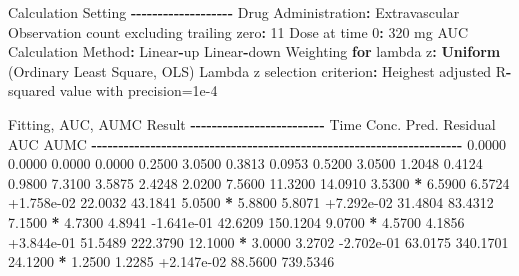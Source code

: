 \documentclass[
  10pt,
]{krantz}
\makeatletter
\newenvironment{Shaded}{\begin{snugshade}}{\end{snugshade}}
\newcommand{\ControlFlowTok}[1]{\textcolor[rgb]{0.13,0.29,0.53}{\textbf{#1}}}
\newcommand{\DecValTok}[1]{\textcolor[rgb]{0.00,0.00,0.81}{#1}}
\newcommand{\FloatTok}[1]{\textcolor[rgb]{0.00,0.00,0.81}{#1}}
\newcommand{\KeywordTok}[1]{\textcolor[rgb]{0.13,0.29,0.53}{\textbf{#1}}}
\newcommand{\NormalTok}[1]{#1}
\newcommand{\OperatorTok}[1]{\textcolor[rgb]{0.81,0.36,0.00}{\textbf{#1}}}
\newcommand{\StringTok}[1]{\textcolor[rgb]{0.31,0.60,0.02}{#1}}
\newenvironment{kframe}{%
\medskip{}
\setlength{\fboxsep}{.8em}
 \def\at@end@of@kframe{}%
 \ifinner\ifhmode%
  \def\at@end@of@kframe{\end{minipage}}%
  \begin{minipage}{\columnwidth}%
 \fi\fi%
 \def\FrameCommand##1{\hskip\@totalleftmargin \hskip-\fboxsep
 \colorbox{shadecolor}{##1}\hskip-\fboxsep
     \hskip-\linewidth \hskip-\@totalleftmargin \hskip\columnwidth}%
 \MakeFramed {\advance\hsize-\width
   \@totalleftmargin\z@ \linewidth\hsize
   \@setminipage}}%
 {\par\unskip\endMakeFramed%
 \at@end@of@kframe}
\renewenvironment{Shaded}{\begin{kframe}}{\end{kframe}}
\makeatother
\begin{document}
\begin{Shaded}
\begin{Highlighting}[]
\NormalTok{Calculation Setting}
\OperatorTok{{-}{-}{-}{-}{-}{-}{-}{-}{-}{-}{-}{-}{-}{-}{-}{-}{-}{-}{-}}
\NormalTok{Drug Administration}\OperatorTok{:}\StringTok{ }\NormalTok{Extravascular}
\NormalTok{Observation count excluding trailing zero}\OperatorTok{:}\StringTok{ }\DecValTok{11}
\NormalTok{Dose at time }\DecValTok{0}\OperatorTok{:}\StringTok{ }\DecValTok{320}\NormalTok{ mg}
\NormalTok{AUC Calculation Method}\OperatorTok{:}\StringTok{ }\NormalTok{Linear}\OperatorTok{{-}}\NormalTok{up Linear}\OperatorTok{{-}}\NormalTok{down}
\NormalTok{Weighting }\ControlFlowTok{for}\NormalTok{ lambda z}\OperatorTok{:}\StringTok{ }\KeywordTok{Uniform}\NormalTok{ (Ordinary Least Square, OLS)}
\NormalTok{Lambda z selection criterion}\OperatorTok{:}\StringTok{ }\NormalTok{Heighest adjusted R}\OperatorTok{{-}}\NormalTok{squared value with precision=}\FloatTok{1e{-}4}


\NormalTok{Fitting, AUC, AUMC Result}
\OperatorTok{{-}{-}{-}{-}{-}{-}{-}{-}{-}{-}{-}{-}{-}{-}{-}{-}{-}{-}{-}{-}{-}{-}{-}{-}{-}}
\StringTok{      }\NormalTok{Time         Conc.      Pred.   Residual       AUC       AUMC}
\OperatorTok{{-}{-}{-}{-}{-}{-}{-}{-}{-}{-}{-}{-}{-}{-}{-}{-}{-}{-}{-}{-}{-}{-}{-}{-}{-}{-}{-}{-}{-}{-}{-}{-}{-}{-}{-}{-}{-}{-}{-}{-}{-}{-}{-}{-}{-}{-}{-}{-}{-}{-}{-}{-}{-}{-}{-}{-}{-}{-}{-}{-}{-}{-}{-}{-}{-}{-}{-}{-}{-}}
\StringTok{     }\FloatTok{0.0000}       \FloatTok{0.0000}                           \FloatTok{0.0000}     \FloatTok{0.0000}
     \FloatTok{0.2500}       \FloatTok{3.0500}                           \FloatTok{0.3813}     \FloatTok{0.0953}
     \FloatTok{0.5200}       \FloatTok{3.0500}                           \FloatTok{1.2048}     \FloatTok{0.4124}
     \FloatTok{0.9800}       \FloatTok{7.3100}                           \FloatTok{3.5875}     \FloatTok{2.4248}
     \FloatTok{2.0200}       \FloatTok{7.5600}                          \FloatTok{11.3200}    \FloatTok{14.0910}
     \FloatTok{3.5300} \OperatorTok{*}\StringTok{     }\FloatTok{6.5900}     \FloatTok{6.5724} \FloatTok{+1.758e{-}02}    \FloatTok{22.0032}    \FloatTok{43.1841}
     \FloatTok{5.0500} \OperatorTok{*}\StringTok{     }\FloatTok{5.8800}     \FloatTok{5.8071} \FloatTok{+7.292e{-}02}    \FloatTok{31.4804}    \FloatTok{83.4312}
     \FloatTok{7.1500} \OperatorTok{*}\StringTok{     }\FloatTok{4.7300}     \FloatTok{4.8941} \FloatTok{{-}1.641e{-}01}    \FloatTok{42.6209}   \FloatTok{150.1204}
     \FloatTok{9.0700} \OperatorTok{*}\StringTok{     }\FloatTok{4.5700}     \FloatTok{4.1856} \FloatTok{+3.844e{-}01}    \FloatTok{51.5489}   \FloatTok{222.3790}
    \FloatTok{12.1000} \OperatorTok{*}\StringTok{     }\FloatTok{3.0000}     \FloatTok{3.2702} \FloatTok{{-}2.702e{-}01}    \FloatTok{63.0175}   \FloatTok{340.1701}
    \FloatTok{24.1200} \OperatorTok{*}\StringTok{     }\FloatTok{1.2500}     \FloatTok{1.2285} \FloatTok{+2.147e{-}02}    \FloatTok{88.5600}   \FloatTok{739.5346}


\end{Highlighting}
\end{Shaded}
\end{document}
